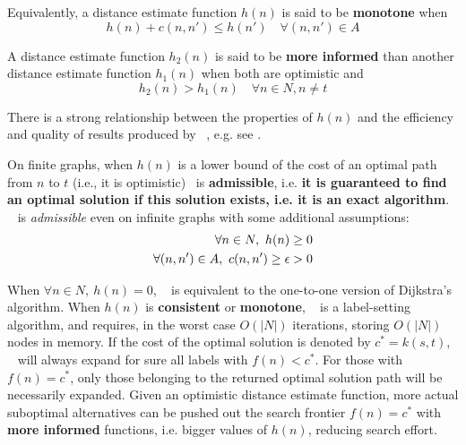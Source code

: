 \begin{defi}\label{chapMultiObjAlg:def:singleObjMonotonicity}
Equivalently, a distance estimate function $h(n)$ is said to be \textbf{monotone} when
\begin{equation}\label{chapMultiObjAlg:eq:singleObjMonotonicity}
 h(n) + c(n,n') \leq h(n') \quad \forall (n,n') \in A 
\end{equation}
\end{defi}

\begin{defi}\label{chapMultiObjAlg:def:singleObjMoreInformedHeu}
A distance estimate function $h_2(n)$ is said to be \textbf{more informed} than another distance estimate function $h_1(n)$ when both are optimistic and
\begin{equation}\label{chapMultiObjAlg:eq:singleObjMoreInformedHeu}
 h_2(n) > h_1(n) \quad \forall n \in N, n \neq t 
\end{equation}
\end{defi}

There is a strong relationship between the properties of $h(n)$ and the efficiency and quality of results produced by \astar~, e.g. see \citep{Pearl1984}.

\begin{property}[Admissibility]\label{chapMultiObjAlg:eq:singleObjAdmissibility}

On finite graphs, when $h(n)$ is a lower bound of the cost of an optimal path from $n$ to $t$ (i.e., it is optimistic) \astar \ is \textbf{admissible}, i.e. \textbf{it is guaranteed to find an optimal solution if this solution exists, i.e. it is an exact algorithm}. \astar~ is \emph{admissible} even on infinite graphs with some additional assumptions:
\begin{eqnarray}\label{chapMultiObjAlg:eq:singleObjAdmissibilityCond}
\forall n \in N,\ h(n) \geq 0   \newline \\    
\nonumber \forall (n,n') \in A,\ c(n,n') \geq \epsilon > 0  
\end{eqnarray}
\end{property}

\begin{property}[Efficiency]\label{chapMultiObjAlg:eq:singleObjEfficiency}

When $\forall n \in N, \  h(n) = 0$, \astar~ is equivalent to the one-to-one version of Dijkstra's algorithm. When $h(n)$ is \textbf{consistent} or \textbf{monotone}, \astar~ is a label-setting algorithm, and requires, in the worst case $O(|N|)$ iterations, storing $O(|N|)$ nodes in memory. If the cost of the optimal solution is denoted by $c^*=k(s,t)$, \astar~ will always expand for sure all labels with $f(n) < c^*$. For those with $f(n) = c^*$, only those belonging to the returned optimal solution path will be necessarily expanded. Given an optimistic distance estimate function, more actual suboptimal alternatives can be pushed out the search frontier $f(n) = c^*$ with \textbf{more informed} functions, i.e. bigger values of $h(n)$, reducing search effort.
\end{property}

